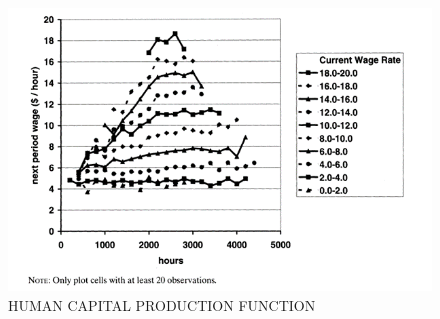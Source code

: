 \hypertarget{HCprodfunc}{}
\begin{figure}[tbp]
  \centerline{\includegraphics[width=6in]{../FigDir/Figure2.png}}
  \caption{HUMAN CAPITAL PRODUCTION FUNCTION} 
  \label{fig:HCprodfunc}
\end{figure}
